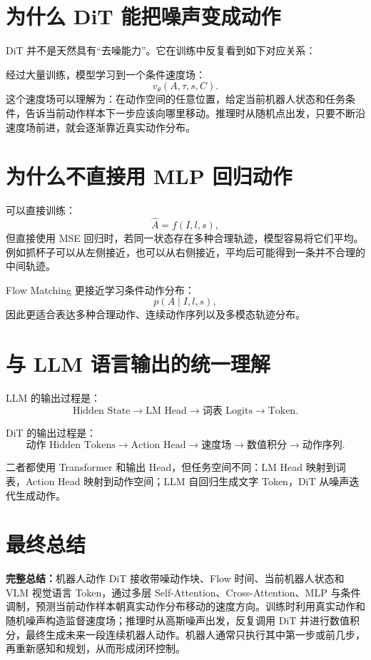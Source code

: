 \documentclass[UTF8,11pt,a4paper]{ctexart}
\begin{document}
\section{为什么 DiT 能把噪声变成动作}

DiT 并不是天然具有“去噪能力”。它在训练中反复看到如下对应关系：

\begin{center}
\end{center}

经过大量训练，模型学习到一个条件速度场：
\[
v_\theta(A,\tau,s,C).
\]
这个速度场可以理解为：在动作空间的任意位置，给定当前机器人状态和任务条件，告诉当前动作样本下一步应该向哪里移动。推理时从随机点出发，只要不断沿速度场前进，就会逐渐靠近真实动作分布。

\section{为什么不直接用 MLP 回归动作}

可以直接训练：
\[
\hat A=f(I,l,s),
\]
但直接使用 MSE 回归时，若同一状态存在多种合理轨迹，模型容易将它们平均。例如抓杯子可以从左侧接近，也可以从右侧接近，平均后可能得到一条并不合理的中间轨迹。

Flow Matching 更接近学习条件动作分布：
\[
p(A\mid I,l,s),
\]
因此更适合表达多种合理动作、连续动作序列以及多模态轨迹分布。

\section{与 LLM 语言输出的统一理解}

LLM 的输出过程是：
\[
\text{Hidden State}\rightarrow\text{LM Head}\rightarrow\text{词表 Logits}\rightarrow\text{Token}.
\]

DiT 的输出过程是：
\[
\text{动作 Hidden Tokens}\rightarrow\text{Action Head}\rightarrow\text{速度场}\rightarrow\text{数值积分}\rightarrow\text{动作序列}.
\]

二者都使用 Transformer 和输出 Head，但任务空间不同：LM Head 映射到词表，Action Head 映射到动作空间；LLM 自回归生成文字 Token，DiT 从噪声迭代生成动作。

\section{最终总结}

\begin{keybox}
\textbf{完整总结：}机器人动作 DiT 接收带噪动作块、Flow 时间、当前机器人状态和 VLM 视觉语言 Token，通过多层 Self-Attention、Cross-Attention、MLP 与条件调制，预测当前动作样本朝真实动作分布移动的速度方向。训练时利用真实动作和随机噪声构造监督速度场；推理时从高斯噪声出发，反复调用 DiT 并进行数值积分，最终生成未来一段连续机器人动作。机器人通常只执行其中第一步或前几步，再重新感知和规划，从而形成闭环控制。
\end{keybox}
\end{document}
